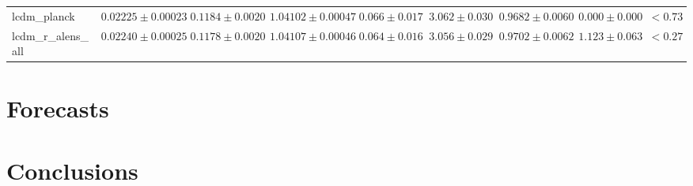 \documentclass[preprint]{emulateapj}
\begin{document}
\begin{table*}[htb]
\begin{center}
\begin{tabular}{l || c c c c c c c | c}
lcdm\_planck & $ 0.02225\pm  0.00023$ & $ 0.1184\pm  0.0020$ & $ 1.04102\pm  0.00047$ & $ 0.066\pm  0.017$ & $ 3.062\pm  0.030$ & $ 0.9682\pm  0.0060$ & $ 0.000 \pm  0.000$ & $< 0.73$ \\
lcdm\_r\_alens\_all & $ 0.02240\pm  0.00025$ & $ 0.1178\pm  0.0020$ & $ 1.04107\pm  0.00046$ & $ 0.064\pm  0.016$ & $ 3.056\pm  0.029$ & $ 0.9702\pm  0.0062$ & $ 1.123 \pm  0.063$ & $< 0.27$ \\
\end{tabular}
 \normalsize
\end{center}
\end{table*}

\section{Forecasts}
\label{sec:forecasts}

\section{Conclusions}
\label{sec:conclusions}




\end{document}
